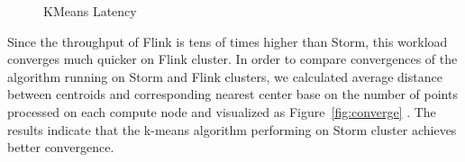 \begin{figure}
  \begin{center}
   \caption{KMeans Latency}
   \label{fig:kmeans_latency}
  \end{center}
\end{figure}

Since the throughput of Flink is tens of times higher than Storm, this workload converges much quicker on Flink cluster. In order to compare convergences of the algorithm running on Storm and Flink clusters, we calculated average distance between centroids and corresponding nearest center base on the number of points processed on each compute node and visualized as Figure~\ref{fig:converge} . The results indicate that the k-means algorithm performing on Storm cluster achieves better convergence.

